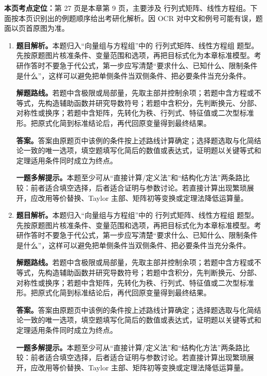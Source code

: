 \begin{solutionblock}
\textbf{本页考点定位：}第 27 页是本章第 9 页，主要涉及 行列式矩阵、线性方程组。下面按本页识别出的例题顺序给出考研化解析。因 OCR 对中文和例号可能有误，题面以页首原图为准。

\begin{enumerate}[label=\textbf{例\arabic*.}, leftmargin=2.4em]

\item \textbf{题目解析。}本题归入“向量组与方程组”中的 行列式矩阵、线性方程组 题型。先按原题图片核准条件、变量范围和选项，再把目标式化为本章标准模型。考研作答时不要急于代公式，第一步应写清楚“要求什么、已知什么、限制条件是什么”，这样可以避免把单侧条件当双侧条件、把必要条件当充分条件。

\textbf{解题路线。}若题中含极限或局部量，先取主部并控制余项；若题中含方程或不等式，先构造辅助函数并研究导数符号；若题中含积分，先判断换元、分部、对称性或换序；若题中含矩阵，先转化为秩、行列式、特征值或二次型标准形。把原式化简到标准结论后，再代回原变量得到最终结果。

\textbf{答案。}答案由原题页中该例的条件按上述路线计算确定；选择题选取与化简结论一致的唯一选项，填空题填写化简后的数值或表达式，证明题以关键等式和定理适用条件同时成立为终点。

\textbf{一题多解提示。}本题至少可从“直接计算/定义法”和“结构化方法”两条路比较：前者适合填空选择，后者适合证明与参数讨论。若直接计算出现繁琐展开，应改用等价替换、Taylor 主部、矩阵初等变换或定理法降低运算量。

\item \textbf{题目解析。}本题归入“向量组与方程组”中的 行列式矩阵、线性方程组 题型。先按原题图片核准条件、变量范围和选项，再把目标式化为本章标准模型。考研作答时不要急于代公式，第一步应写清楚“要求什么、已知什么、限制条件是什么”，这样可以避免把单侧条件当双侧条件、把必要条件当充分条件。

\textbf{解题路线。}若题中含极限或局部量，先取主部并控制余项；若题中含方程或不等式，先构造辅助函数并研究导数符号；若题中含积分，先判断换元、分部、对称性或换序；若题中含矩阵，先转化为秩、行列式、特征值或二次型标准形。把原式化简到标准结论后，再代回原变量得到最终结果。

\textbf{答案。}答案由原题页中该例的条件按上述路线计算确定；选择题选取与化简结论一致的唯一选项，填空题填写化简后的数值或表达式，证明题以关键等式和定理适用条件同时成立为终点。

\textbf{一题多解提示。}本题至少可从“直接计算/定义法”和“结构化方法”两条路比较：前者适合填空选择，后者适合证明与参数讨论。若直接计算出现繁琐展开，应改用等价替换、Taylor 主部、矩阵初等变换或定理法降低运算量。

\end{enumerate}
\end{solutionblock}



